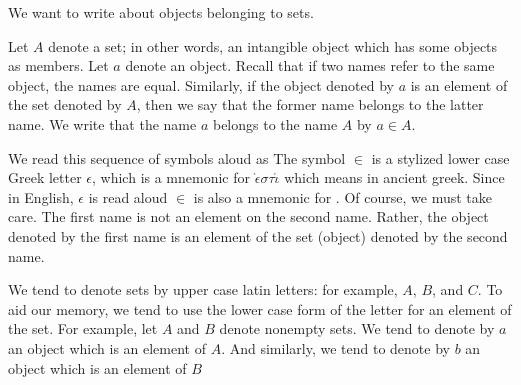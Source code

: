 

We want to write about objects belonging to sets.


Let $A$ denote a set; in other words, an intangible object which has some objects as members.
Let $a$ denote an object.
Recall that if two names refer to the same object, the names are equal.
Similarly, if the object denoted by $a$ is an element of the set denoted by $A$, then we say that the former name belongs to the latter name.
We write that the name $a$ belongs to the name $A$ by $a \in A$.

We read this sequence of symbols aloud as 
The symbol $\in$ is a stylized lower case Greek letter $\epsilon$, which is a mnemonic for $\grave{\epsilon} \sigma \tau \acute{\iota}$ which means  in ancient greek.
Since in English, $\epsilon$ is read aloud  $\in$ is also a mnemonic for .
Of course, we must take care.
The first name is not an element on the second name.
Rather, the object denoted by the first name is an element of the set (object) denoted by the second name.



We tend to denote sets by upper case latin letters: for example, $A$, $B$, and $C$.
To aid our memory, we tend to use the lower case form of the letter for an element of the set.
For example, let $A$ and $B$ denote nonempty sets.
We tend to denote by $a$ an object which is an element of $A$.
And similarly, we tend to denote by $b$ an object which is an element of $B$

\blankpage
